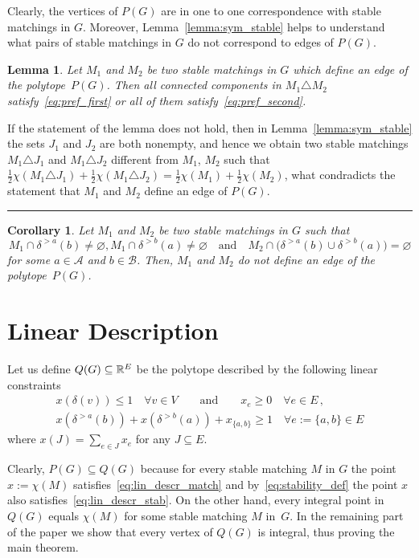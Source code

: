 \documentclass[preprint]{elsarticle}
\newtheorem{lemma}[fact]{Lemma}
\newtheorem{corollary}[fact]{Corollary}
\newenvironment{proof}{{\bf Proof:  }}{\hfill\rule{2mm}{2mm}}
\begin{document}
Clearly, the vertices of $P(G)$ are in one to one correspondence with stable matchings in $G$. Moreover, Lemma~\ref{lemma:sym_stable} helps to understand what pairs of stable matchings in $G$ do not correspond to edges of $P(G)$.

\begin{lemma}\label{lemma:edge}
Let $M_1$ and $M_2$ be two stable matchings in $G$ which define an edge of the polytope~$P(G)$. Then all connected components in $M_1\triangle M_2$ satisfy~\eqref{eq:pref_first} or all of them satisfy~\eqref{eq:pref_second}.  
\end{lemma}
\begin{proof}
If the statement of the lemma does not hold, then in Lemma~\ref{lemma:sym_stable} the sets $J_1$ and $J_2$ are both nonempty, and hence we obtain two stable matchings $M_1\triangle J_1$ and $M_1\triangle J_2$ different from $M_1$, $M_2$ such that $\frac{1}{2}\chi(M_1\triangle J_1)+\frac{1}{2}\chi(M_1\triangle J_2)=\frac{1}{2}\chi(M_1)+\frac{1}{2}\chi(M_2)$, what condradicts the statement that $M_1$ and $M_2$ define an edge of $P(G)$.
\end{proof}


\begin{corollary}\label{cor:edge}
Let $M_1$ and $M_2$ be two stable matchings in $G$ such that
$$
	M_1\cap\delta^{>a}(b)\neq\varnothing, M_1\cap\delta^{>b}(a)\neq\varnothing\quad\text{and}\quad M_2\cap\big(\delta^{>a}(b)\cup \delta^{>b}(a)\big)=\varnothing 
$$
 for some $a\in\mathcal{A}$ and $b\in\mathcal{B}$. Then, $M_1$ and $M_2$ do not define an edge of the polytope~$P(G)$.
\end{corollary}


\section{Linear Description}
Let us define $Q(G)\subseteq\mathbb{R}^E$ be the polytope described  by the following linear constraints
\begin{align}
x(\delta(v)) \leq 1\quad \forall v \in V\qquad \text{and} \qquad x_e \geq 0\quad \forall e \in E\,,\label{eq:lin_descr_match}\\
x(\delta^{>a}(b))+ x(\delta^{>b}(a)) + x_{\{a,b\}} \geq 1 \quad \forall e:=\{a,b\} \in E \label{eq:lin_descr_stab}
\end{align}
where $x(J) = \sum_{e \in J} x_e$ for any $J \subseteq E$.

Clearly, $P(G)\subseteq Q(G)$ because for every stable matching $M$ in $G$ the point $x:=\chi(M)$  satisfies~\eqref{eq:lin_descr_match} and by~\eqref{eq:stability_def} the point $x$ also satisfies~\eqref{eq:lin_descr_stab}. On the other hand, every integral point in $Q(G)$ equals $\chi(M)$ for some stable matching $M$ in~$G$. In the remaining part of the paper we show that every vertex of $Q(G)$ is integral, thus proving the main theorem.
\end{document}
